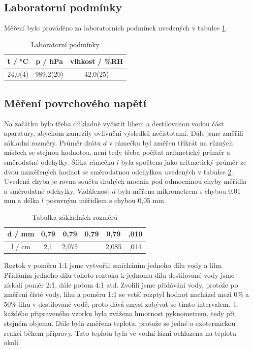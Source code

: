 \subsection{Laboratorní podmínky}

    Měření bylo prováděno za laboratorních podmínek uvedených v tabulce \ref{tab:lab_pod}.

    \begin{table}[h]
        \centering
        \begin{tabular}{|c|c|c|} 
        \hline
            t / °C & p / hPa & vlhkost / \%RH  \\ 
        \hline
            24,0(4)   & 989,2(20)   & 42,0(25)            \\
        \hline
        \end{tabular}
        \caption{Laboratorní podmínky}
        \label{tab:lab_pod}
    \end{table}

\subsection{Měření povrchového napětí}

Na začátku bylo třeba důkladně vyčistit lihem a destilovanou vodou část aparatury, abychom zamezily ovlivněni výsledků nečistotami. Dále jsme změřili základní rozměry. Průměr drátu $d$ v rámečku byl změřen třikrát na různých místech se stejnou hodnotou, není tedy třeba počítat aritmetický průměr a směrodatné odchylky. Šířka rámečku $l$ byla spočtena jako aritmetický průměr ze dvou naměřených hodnot se směrodatnou odchylkou uvedených v tabulce \ref{tab:zakladni-rozmery}. Uvedená chyba je rovna součtu druhých mocnin pod odmocninou chyby měřidla a směrodatné odchylky. Vzdálenost $d$ byla měřena mikrometrem s chybou 0,01 mm a délka $l$ posuvným měřidlem s chybou 0,05 mm.

\begin{table}[h]
\centering
\begin{tabular}{|c|ccc|cc|}
\hline
d / mm & 0,79 & 0,79  & 0,79 & 0,79  & \pm 0,010     \\ \hline
l / cm & 2,1  & 2,075 &      & 2,085 & \pm 0,014 \\ \hline
\end{tabular}
\caption{Tabulka základních rozměrů}
\label{tab:zakladni-rozmery}
\end{table}

Roztok v poměru 1:1 jsme vytvořili smícháním jednoho dílu vody a lihu. Přidáním jednoho dílu tohoto roztoku k jednomu dílu destilované vody jsme získali poměr 2:1, dále potom 4:1 atd. Zvolili jsme přidávání vody, protože po změření čisté vody, lihu a poměru 1:1 se vetší rozptyl hodnot nacházel mezi 0\% a 50\% lihu v destilované vodě, proto dává smysl zabývat se tímto intervalem. U každého připraveného vzorku byla zvážena hmotnost pyknometrem, tedy při stejném objemu. Dále byla změřena teplota, protože se jedné o exotermickou reakci během přípravy. Tato teplota byla ve vodní lázni ochlazena na teplotu okolí.

